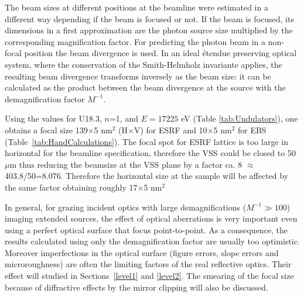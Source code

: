 \documentclass{iucr}              %
\newcommand{\inred}[1]{{\color{red}#1}}
\begin{document}
The beam sizes at different positions at the beamline were estimated in a different way depending if the beam is focused or not. If the beam is focused, its dimensions in a first approximation are the photon source size multiplied by the corresponding magnification factor. For predicting the photon beam in a non-focal position the beam divergence is used. In an ideal {\'{e}}tendue preserving optical system, where the conservation of the Smith-Helmholz invariante applies, the resulting beam divergence transforms inversely as the beam size: it can be calculated as the product between the beam divergence at the source with the demagnification factor $M^{-1}$.

Using the values for U18.3, $n$=1, and  $E=17225$ eV (Table \ref{tab:Undulators}), one obtains a focal size 139$\times$5 nm$^2$ (H$\times$V) for ESRF and 10$\times$5 nm$^2$ for EBS (Table~\ref{tab:HandCalculations}). The focal spot for ESRF lattice is too large in horizontal for the beamline specification, therefore the VSS could be closed to 50$\mu$m thus reducing the beamsize at the VSS plane by a factor ca. 8 \inred{$\approx$ 403.8/50=8.076}. Therefore the horizontal size at the sample will be affected by the same factor obtaining roughly 17$\times$5 nm$^2$

In general, for grazing incident optics with large demagnifications ($M^{-1} \gg 100$) imaging extended sources, the effect of optical aberrations is very important even using a perfect optical surface that focus point-to-point. As a consequence, the results calculated using only the demagnification factor are usually too optimistic. Moreover imperfections in the optical surface (figure errors, slope errors and microroughness) are often the limiting factors of the real reflective optics. Their effect will studied in Sections~\ref{level1} and \ref{level2}. The smearing of the focal size because of diffractive effects by the mirror clipping will also be discussed. 
\end{document}
